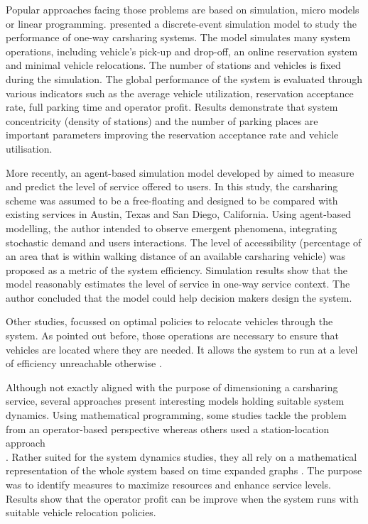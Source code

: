 \medskip
Popular approaches facing those problems are based on simulation, micro models or linear programming.
\cite{li_design_2011} presented a discrete-event simulation model to study the performance of one-way carsharing systems.
The model simulates many system operations, including vehicle's pick-up and drop-off, an online reservation system and minimal vehicle relocations.
The number of stations and vehicles is fixed during the simulation.
The global performance of the system is evaluated through various indicators such as the average vehicle utilization, reservation acceptance rate, full parking time and operator profit.
Results demonstrate that system concentricity (density of stations) and the number of parking places are important parameters improving the reservation acceptance rate and vehicle utilisation.


\medskip
More recently, an agent-based simulation model developed by \cite{barrios_performance_2012} aimed to measure and predict the level of service offered to users.
In this study, the carsharing scheme was assumed to be a free-floating and designed to be compared with existing services in Austin, Texas and San Diego, California.
Using agent-based modelling, the author intended to observe emergent phenomena, integrating stochastic demand and users interactions.
The level of accessibility (percentage of an area that is within walking distance of an available carsharing vehicle) was proposed as a metric of the system efficiency.
Simulation results show that the model reasonably estimates the level of service in one-way service context.
The author concluded that the model could help decision makers design the system.


\medskip
Other studies, focussed on optimal policies to relocate vehicles through the system.
As pointed out before, those operations are necessary to ensure that vehicles are located where they are needed.
It allows the system to run at a level of efficiency unreachable otherwise \cite{mitchell_reinventing_2010, nair_fleet_2011, febbraro_one_2012}.

Although not exactly aligned with the purpose of dimensioning a carsharing service, several approaches present interesting models holding suitable system dynamics.
Using mathematical programming, some studies tackle the problem from an operator-based perspective \cite{kek_relocation_2006, kek_decision_2009} whereas others used a station-location approach\\ \cite{correia_optimization_2012, jorge_testing_2012}.
Rather suited for the system dynamics studies, they all rely on a mathematical representation of the whole system based on time expanded graphs \cite{ahuja_network_1993}.
The purpose was to identify measures to maximize resources and enhance service levels.
Results show that the operator profit can be improve when the system runs with suitable vehicle relocation policies.



